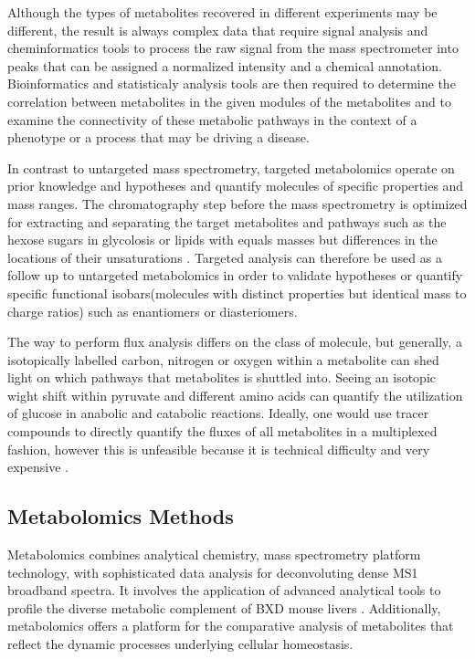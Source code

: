 \documentclass[a4paper,11pt,twoside]{book}
\begin{document}
    Although the types of metabolites recovered in different experiments may be different, the result is always complex data that require signal analysis and cheminformatics tools to process the raw signal from the mass spectrometer into peaks that can be assigned a normalized intensity and a chemical annotation. Bioinformatics and statisticaly analysis tools are then required to determine the correlation between metabolites in the given modules of the metabolites and to examine the connectivity of these metabolic pathways in the context of a phenotype or a process that may be driving a disease\citep{Aksenov2017GlobalSpectrometry}.
	
	In contrast to untargeted mass spectrometry, targeted metabolomics operate on prior knowledge and hypotheses and quantify molecules of specific properties and mass ranges. The chromatography step before the mass spectrometry is optimized for extracting and separating the target metabolites and pathways such as the hexose sugars in glycolosis or lipids with equals masses but differences in the locations of their unsaturations \citep{Cani2009}. Targeted analysis can therefore be used as a follow up to untargeted metabolomics in order to validate hypotheses or quantify specific functional isobars(molecules with distinct  properties but identical mass to charge ratios) such as enantiomers or diasteriomers.
	
	The way to perform flux analysis differs on the class of molecule, but generally, a isotopically labelled carbon, nitrogen or oxygen within a metabolite can shed light on which pathways that metabolites is shuttled into\citep{Zamboni200913C-basedAnalysis}. Seeing an isotopic wight shift within pyruvate and different amino acids can quantify the utilization of glucose in anabolic and catabolic reactions. Ideally, one would use tracer compounds to directly quantify the fluxes of all metabolites in a multiplexed fashion, however this is unfeasible because it is technical difficulty and very expensive \citep{Zamboni200913C-basedAnalysis}. 
	
	
	\subsection{Metabolomics Methods}
	
	Metabolomics combines analytical chemistry, mass spectrometry platform technology, with sophisticated data analysis for deconvoluting dense MS1 broadband spectra. It involves the application of advanced analytical tools to profile the diverse metabolic complement of BXD mouse livers \citep{Coen2010}. Additionally, metabolomics offers a platform for the comparative analysis of metabolites that reflect the dynamic processes underlying cellular homeostasis\citep{Aksenov2017GlobalSpectrometry}.
	
\end{document}
